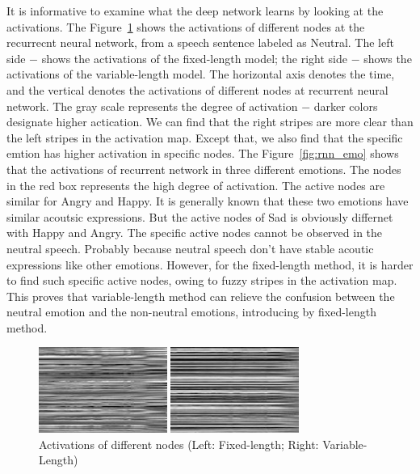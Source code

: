 \documentclass[a4paper]{article}
\begin{document}
It is informative to examine what the deep network learns by looking at the activations. The Figure~\ref{fig:rnn_comp} shows the activations of different nodes at the recurrecnt neural network, from a speech sentence labeled as Neutral. The left side $-$ shows the activations of the fixed-length model; the right side $-$ shows the activations of the variable-length model. The horizontal axis denotes the time, and the vertical denotes the activations of different nodes at recurrent neural network. The gray scale represents the degree of activation $-$ darker colors designate higher actication. We can find that the right stripes are more clear than the left stripes in the activation map. Except that, we also find that the specific emtion has higher activation in specific nodes. The Figure~\ref{fig:rnn_emo} shows that the activations of recurrent network in three different emotions. The nodes in the red box represents the high degree of activation. The active nodes are similar for Angry and Happy. It is generally known that these two emotions have similar acoutsic expressions. But the active nodes of Sad is obviously differnet with Happy and Angry. The specific active nodes cannot be observed in the neutral speech. Probably because neutral speech don't have stable acoutic expressions like other emotions. However, for the fixed-length method, it is harder to find such specific active nodes, owing to fuzzy stripes in the activation map. This proves that variable-length method can relieve the confusion between the neutral emotion and the non-neutral emotions, introducing by fixed-length method. 

\begin{figure}[htb]
    \begin{minipage}[b]{.45\linewidth}
      \centering
      \centerline{\includegraphics[width=4.2cm]{rnn_out_const_neu_comp}}
    \end{minipage}
    \hfill
    \begin{minipage}[b]{0.45\linewidth}
      \centering
      \centerline{\includegraphics[width=4.2cm]{rnn_out_var_neu_comp}}
    \end{minipage}
    \caption{Activations of different nodes (Left: Fixed-length; Right: Variable-Length)}
    \label{fig:rnn_comp}
\end{figure}
\end{document}
